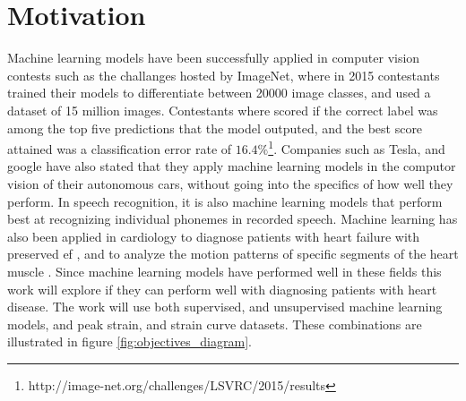 \section{Motivation}

Machine learning models have been successfully applied in computer vision contests such as the challanges hosted by ImageNet, where in 2015 contestants trained their models to differentiate between 20000 image classes, and used a dataset of 15 million images. Contestants where scored if the correct label was among the top five predictions that the model outputed, and the best score attained was a classification error rate of $16.4\%$\footnote{http://image-net.org/challenges/LSVRC/2015/results}. Companies such as Tesla, and google have also stated that they apply machine learning models in the computor vision of their autonomous cars, without going into the specifics of how well they perform. In speech recognition, it is also machine learning models that perform best at recognizing individual phonemes in recorded speech. Machine learning has also been applied in cardiology to diagnose patients with heart failure with preserved \acrshort{ef} \cite{hf_diagnosis_ml}, and to analyze the motion patterns of specific segments of the heart muscle \cite{myocardial_motion_pattern, myocardial_defomation_analysis}. Since machine learning models have performed well in these fields this work will explore if they can perform well with diagnosing patients with heart disease. The work will use both supervised, and unsupervised machine learning models, and peak strain, and strain curve datasets. These combinations are illustrated in figure \ref{fig:objectives_diagram}.

